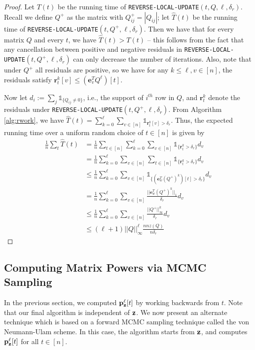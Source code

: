 \begin{proof}
Let $T(t)$ be the running time of \texttt{REVERSE-LOCAL-UPDATE}$(t,Q,\ell,\delta_r)$.
Recall we define $Q^+$ as the matrix with $Q^+_{ij} = |Q_{ij}|$; let $\hat{T}(t)$ be the running time of \texttt{REVERSE-LOCAL-UPDATE}$(t,Q^+,\ell,\delta_r)$. 
Then we have that for every matrix $Q$ and every $t$, we have $\hat{T}(t)>T(t)$ -- this follows from the fact that any cancellation between positive and negative residuals in \texttt{REVERSE-LOCAL-UPDATE}$(t,Q^+,\ell,\delta_r)$ can only decrease the number of iterations. 
Also, note that under $Q^+$ all residuals are positive, so we have for any $k\leq\ell,v\in[n]$, the residuals satisfy $\mathbf{r}_t^{k}[v]\leq \left(\mathbf{e}_v^TQ^\ell\right)[t]$.

Now let $d_i := \sum_j\mathds{1}_{\{Q_{ij}\neq 0\}}$, i.e., the support of $i^{th}$ row in $Q$, and $\mathbf{r}_t^{k}$ denote the residuals under \texttt{REVERSE-LOCAL-UPDATE}$(t,Q^+,\ell,\delta_r)$. 
From Algorithm \ref{alg:rwork}, we have $\hat{T}(t) = \sum_{k=0}^{\ell}\sum_{v\in[n]}\mathds{1}_{\mathbf{r}_t^{k}[v]>\delta_r}$.
Thus, the expected running time over a uniform random choice of $t\in[n]$ is given by
\begin{align*}
\frac{1}{n}\sum_t\hat{T}(t) &= \frac{1}{n}\sum_{t\in[n]}\sum_{k=0}^{\ell}\sum_{v\in[n]}\mathds{1}_{\{\mathbf{r}_t^{k}>\delta_r\}}d_v\\
&=\frac{1}{n}\sum_{k=0}^{\ell}\sum_{v\in[n]}\sum_{t\in[n]}\mathds{1}_{\{\mathbf{r}_t^{k}>\delta_r\}}d_v\\
&\leq\frac{1}{n}\sum_{k=0}^{\ell}\sum_{v\in[n]} \mathds{1}_{\{\left(\mathbf{e}_w^T(Q^+)^k\right)[t]>\delta_r\}}d_v\\
&=\frac{1}{n}\sum_{k=0}^{\ell}\sum_{v\in[n]} \frac{||\mathbf{e}_w^T(Q^+)^k||_1}{\delta_r}d_v\\
&\leq\frac{1}{n}\sum_{k=0}^{\ell}\sum_{v\in[n]} \frac{||Q^+||_{\infty}^k}{\delta_r}d_v\\
&\leq\left(\ell+1\right)||Q||_{\infty}^{\ell} \frac{nnz(Q)}{n\delta_r}
\end{align*}
\end{proof}


\subsection{Computing Matrix Powers via MCMC Sampling}
\label{ssec:forwardwork}


In the previous section, we computed ${\mathbf{p}}_\mathbf{z}^{\ell}[t]$ by working backwards from $t$. 
Note that our final algorithm is independent of $\mathbf{z}$.
We now present an alternate technique which is based on a forward MCMC sampling technique called the von Neumann-Ulam scheme. 
In this case, the algorithm starts from $\mathbf{z}$, and computes ${\mathbf{p}}_\mathbf{z}^{\ell}[t]$ for all $t\in[n]$.

